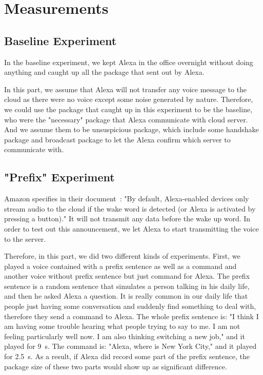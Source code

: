 \section{Measurements}

\subsection{Baseline Experiment}

In the baseline experiment, we kept Alexa in the office overnight without doing anything and caught up all the package that sent out by Alexa.

In this part, we assume that Alexa will not transfer any voice message to the cloud as there were no voice except some noise generated by nature. Therefore, we could use the package that caught up in this experiment to be the baseline, who were the "necessary" package that Alexa communicate with cloud server. And we assume them to be unsuspicious package, which include some handshake package and broadcast package to let the Alexa confirm which server to communicate with.






\subsection{"Prefix" Experiment}

Amazon specifies in their document~\todo{[1]}: "By default, Alexa-enabled devices only stream audio to the cloud if the wake word is detected (or Alexa is activated by pressing a button)." It will not transmit any data before the wake up word. In order to test out this announcement, we let Alexa to start transmitting the voice to the server. 

Therefore, in this part, we did two different kinds of experiments. First, we played a voice contained with a prefix sentence as well as a command and another voice without prefix sentence but just command for Alexa. The prefix sentence is a random sentence that simulates a person talking in his daily life, and then he asked Alexa a question. It is really common in our daily life that people just having some conversation and suddenly find something to deal with, therefore they send a command to Alexa. The whole prefix sentence is: "I think I am having some trouble hearing what people trying to say to me. I am not feeling particularly well now. I am also thinking switching a new job," and it played for 9~s. The command is: "Alexa, where is New York City," and it played for 2.5~s. As a result, if Alexa did record some part of the prefix sentence, the package size of these two parts would show up as significant difference.

